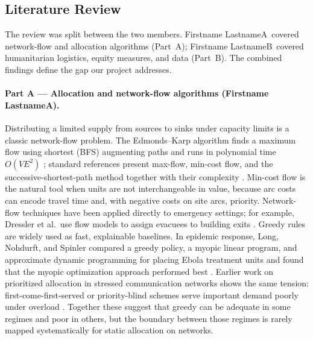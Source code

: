 \documentclass[11pt]{article}
\newcommand{\nameA}{Firstname LastnameA}
\newcommand{\nameB}{Firstname LastnameB}
\begin{document}
\subsection*{Literature Review}
The review was split between the two members. \nameA\ covered network-flow
and allocation algorithms (Part~A); \nameB\ covered humanitarian logistics,
equity measures, and data (Part~B). The combined findings define the gap our
project addresses.

\paragraph{Part A --- Allocation and network-flow algorithms (\nameA).}
Distributing a limited supply from sources to sinks under capacity limits is
a classic network-flow problem. The Edmonds--Karp algorithm finds a maximum
flow using shortest (BFS) augmenting paths and runs in polynomial time
$O(VE^2)$ \cite{edmonds1972}; standard references present max-flow, min-cost
flow, and the successive-shortest-path method together with their complexity
\cite{ahuja1993,clrs}. Min-cost flow is the natural tool when units are not
interchangeable in value, because arc costs can encode travel time and,
with negative costs on site arcs, priority. Network-flow techniques have
been applied directly to emergency settings; for example, Dressler et al.\
use flow models to assign evacuees to building exits \cite{dressler2010}.
Greedy rules are widely used as fast, explainable baselines. In epidemic
response, Long, Nohdurft, and Spinler compared a greedy policy, a myopic
linear program, and approximate dynamic programming for placing Ebola
treatment units and found that the myopic optimization approach performed
best \cite{long2018}. Earlier work on prioritized allocation in stressed
communication networks shows the same tension: first-come-first-served or
priority-blind schemes serve important demand poorly under overload
\cite{beard2001}. Together these suggest that greedy can be adequate in some
regimes and poor in others, but the boundary between those regimes is rarely
mapped systematically for static allocation on networks.
\end{document}
